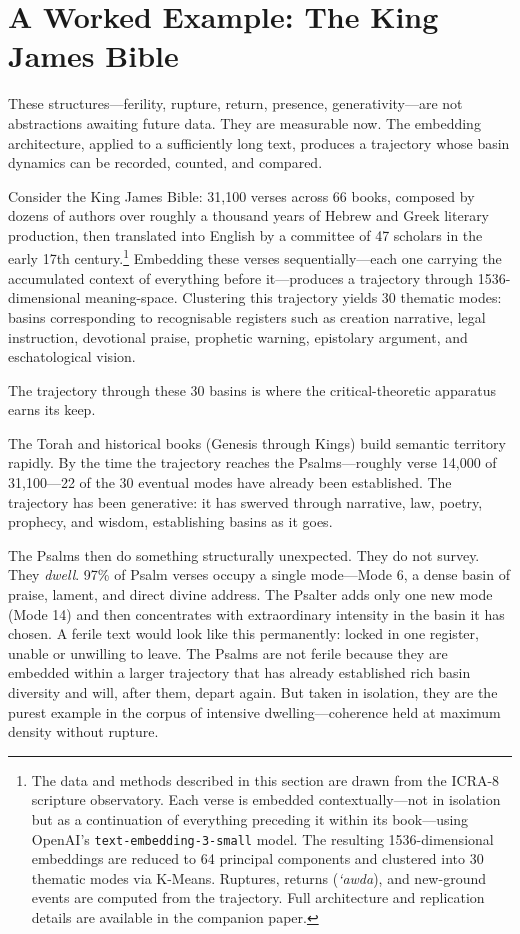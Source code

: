\section{A Worked Example: The King James Bible}

These structures---ferility, rupture, return, presence, generativity---are not abstractions awaiting future data. They are measurable now. The embedding architecture, applied to a sufficiently long text, produces a trajectory whose basin dynamics can be recorded, counted, and compared.

Consider the King James Bible: 31,100 verses across 66 books, composed by dozens of authors over roughly a thousand years of Hebrew and Greek literary production, then translated into English by a committee of 47 scholars in the early 17th century.\footnote{The data and methods described in this section are drawn from the ICRA-8 scripture observatory. Each verse is embedded contextually---not in isolation but as a continuation of everything preceding it within its book---using OpenAI's \texttt{text-embedding-3-small} model. The resulting 1536-dimensional embeddings are reduced to 64 principal components and clustered into 30 thematic modes via K-Means. Ruptures, returns (\emph{`awda}), and new-ground events are computed from the trajectory. Full architecture and replication details are available in the companion paper.} Embedding these verses sequentially---each one carrying the accumulated context of everything before it---produces a trajectory through 1536-dimensional meaning-space. Clustering this trajectory yields 30 thematic modes: basins corresponding to recognisable registers such as creation narrative, legal instruction, devotional praise, prophetic warning, epistolary argument, and eschatological vision.

The trajectory through these 30 basins is where the critical-theoretic apparatus earns its keep.

The Torah and historical books (Genesis through Kings) build semantic territory rapidly. By the time the trajectory reaches the Psalms---roughly verse 14,000 of 31,100---22 of the 30 eventual modes have already been established. The trajectory has been generative: it has swerved through narrative, law, poetry, prophecy, and wisdom, establishing basins as it goes.

The Psalms then do something structurally unexpected. They do not survey. They \emph{dwell}. 97\% of Psalm verses occupy a single mode---Mode 6, a dense basin of praise, lament, and direct divine address. The Psalter adds only one new mode (Mode 14) and then concentrates with extraordinary intensity in the basin it has chosen. A ferile text would look like this permanently: locked in one register, unable or unwilling to leave. The Psalms are not ferile because they are embedded within a larger trajectory that has already established rich basin diversity and will, after them, depart again. But taken in isolation, they are the purest example in the corpus of intensive dwelling---coherence held at maximum density without rupture.

